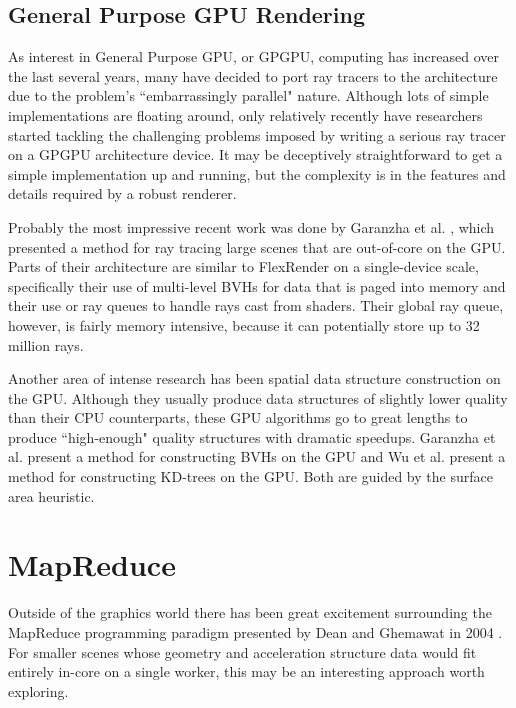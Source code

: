 \documentclass[12pt]{ucthesis}
\begin{document}
\subsection{General Purpose GPU Rendering}
\label{gpgpu}

As interest in General Purpose GPU, or GPGPU, computing has increased over
the last several years, many have decided to port ray tracers to the
architecture due to the problem's ``embarrassingly parallel" nature. Although
lots of simple implementations are floating around, only relatively recently
have researchers started tackling the challenging problems imposed by writing
a serious ray tracer on a GPGPU architecture device. It may be deceptively
straightforward to get a simple implementation up and running, but the
complexity is in the features and details required by a robust renderer.

Probably the most impressive recent work was done by Garanzha et al.
\cite{garanzha:2011:ray}, which presented a method for ray tracing large scenes that
are out-of-core on the GPU. Parts of their architecture are similar to FlexRender
on a single-device scale, specifically their use of multi-level BVHs for data that
is paged into memory and their use or ray queues to handle rays cast from shaders.
Their global ray queue, however, is fairly memory intensive, because it can
potentially store up to 32 million rays.

Another area of intense research has been spatial data structure construction
on the GPU. Although they usually produce data structures of slightly lower
quality than their CPU counterparts, these GPU algorithms go to great lengths
to produce ``high-enough" quality structures with dramatic speedups. Garanzha
et al. \cite{garanzha:2011:bvh} present a method for constructing BVHs on the
GPU and Wu et al. \cite{wu:2011} present a method for constructing KD-trees on
the GPU. Both are guided by the surface area heuristic.

\section{MapReduce}
\label{mapreduce}

Outside of the graphics world there has been great excitement surrounding
the MapReduce programming paradigm presented by Dean and Ghemawat in 2004
\cite{dean:2004}. For smaller scenes whose geometry and acceleration structure
data would fit entirely in-core on a single worker, this may be an interesting
approach worth exploring.
\end{document}
